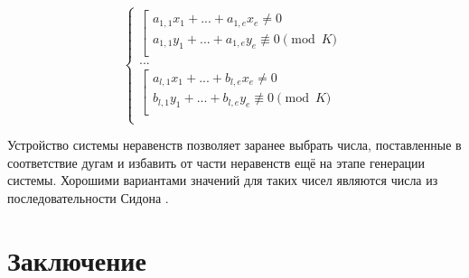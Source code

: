 \documentclass[14pt]{mmcs-article}
\begin{document}
\begin{equation}
  \left\{
    \begin{array}{ll}
        \left[  
          \begin{array}{ll}
              a_{1,1} x_1 + ... + a_{1,e} x_e \neq 0 \\
              a_{1,1} y_1 + ... + a_{1,e} y_e \not\equiv 0 \pmod K \\
          \end{array}
        \right.\\
        ...\\
        \left[  
          \begin{array}{ll}
              a_{l,1} x_1 + ... + b_{l,e} x_e \neq 0 \\
              b_{l,1} y_1 + ... + b_{l,e} y_e \not\equiv 0 \pmod K \\
          \end{array}
        \right.\\
    \end{array}
  \right.
  \label{eqs:3}
\end{equation}

Устройство системы неравенств позволяет заранее выбрать числа, поставленные в соответствие дугам и избавить от части неравенств ещё на этапе генерации системы. Хорошими вариантами значений для таких чисел являются числа из последовательности Сидона \cite{sidon}.

\newpage
{}
\section*{Заключение}



\newpage

\renewcommand{\refname}{\centering \textbf{Литература}}
\end{document}
